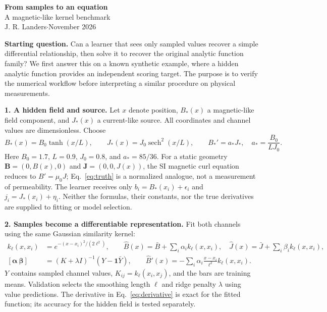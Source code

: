 \documentclass[11pt,letterpaper]{article}
\newcommand{\sech}{\operatorname{sech}}
\begin{document}
\begin{center}
{\Large\bfseries From samples to an equation}\\[3pt]
{\large A magnetic-like kernel benchmark}\\[3pt]
{\small J. R. Landers\quad$\cdot$\quad November 2026}
\end{center}
\vspace{-6pt}

\textbf{Starting question.}
Can a learner that sees only sampled values recover a simple differential relationship,
then solve it to recover the original analytic function family?
We first answer this on a known synthetic example, where a hidden analytic function
provides an independent scoring target. The purpose is to verify the numerical workflow
before interpreting a similar procedure on physical measurements.

\textbf{1. A hidden field and source.}
Let $x$ denote position, $B_*(x)$ a magnetic-like field component, and $J_*(x)$ a
current-like source. All coordinates and channel values are dimensionless. Choose
\begin{equation}
B_*(x)=B_0\tanh(x/L),\qquad J_*(x)=J_0\sech^2(x/L),
\qquad B_*'=a_*J_*,\quad a_*=\frac{B_0}{LJ_0}.
\label{eq:truth}
\end{equation}
Here $B_0=1.7$, $L=0.9$, $J_0=0.8$, and $a_*=85/36$.
For a static geometry $\mathbf B=(0,B(x),0)$ and $\mathbf J=(0,0,J(x))$,
the SI magnetic curl equation reduces to $B'=\mu_0J$; Eq.~\eqref{eq:truth}
is a normalized analogue, not a measurement of permeability.
The learner receives only $b_i=B_*(x_i)+\epsilon_i$ and
$j_i=J_*(x_i)+\eta_i$. Neither the formulas, their constants, nor the true derivatives
are supplied to fitting or model selection.

\textbf{2. Samples become a differentiable representation.}
Fit both channels using the same Gaussian similarity kernel:
\begin{align}
k_\ell(x,x_i)&=e^{-(x-x_i)^2/(2\ell^2)},\qquad
\widehat B(x)=\bar B+\sum_i\alpha_i k_\ell(x,x_i),\quad
\widehat J(x)=\bar J+\sum_i\beta_i k_\ell(x,x_i),\label{eq:fit}\\
[\boldsymbol\alpha\ \boldsymbol\beta]
&=(K+\lambda I)^{-1}(Y-\mathbf1\bar Y),\qquad
\widehat B'(x)=-\sum_i\alpha_i\frac{x-x_i}{\ell^2}k_\ell(x,x_i).
\label{eq:derivative}
\end{align}
$Y$ contains sampled channel values, $K_{ij}=k_\ell(x_i,x_j)$, and the bars are
training means. Validation selects the smoothing length $\ell$ and ridge penalty
$\lambda$ using value predictions. The derivative in Eq.~\eqref{eq:derivative}
is exact for the fitted function; its accuracy for the hidden field is tested separately.
\end{document}
